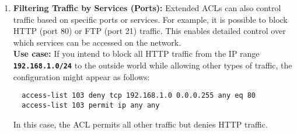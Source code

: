 \documentclass[11pt,a4paper]{article}
\begin{document}
\begin{enumerate}
                \item \textbf{Filtering Traffic by Services (Ports):} Extended ACLs can also control traffic based on specific ports or services. For example, it is possible to block HTTP (port 80) or FTP (port 21) traffic. This enables detailed control over which services can be accessed on the network.
                \\[1em]
                \textbf{Use case:} If you intend to block all HTTP traffic from the IP range \textbf{\lstinline{192.168.1.0/24}} to the outside world while allowing other types of traffic, the configuration might appear as follows:
\begin{lstlisting}
  access-list 103 deny tcp 192.168.1.0 0.0.0.255 any eq 80
  access-list 103 permit ip any any                    
\end{lstlisting}
                In this case, the ACL permits all other traffic but denies HTTP traffic.
            \end{enumerate}
\end{document}
